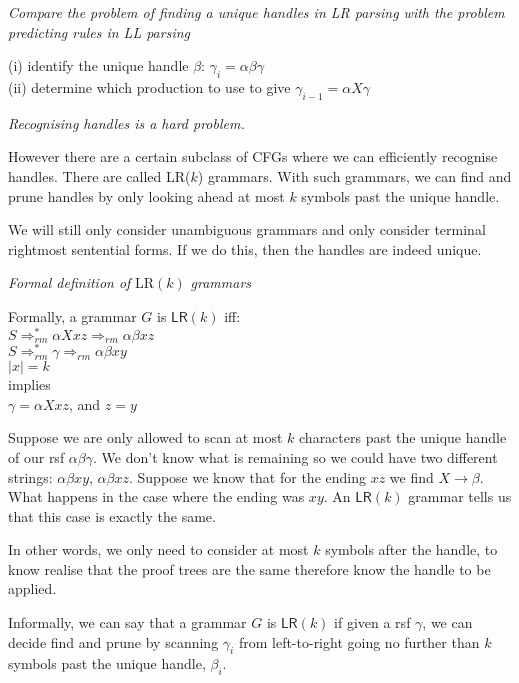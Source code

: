 \frmrule 

\textit{Compare the problem of finding a unique handles in LR parsing with the problem 
predicting rules in LL parsing }

(i) identify the unique handle $\beta$:
$\gamma_i = \alpha \beta\gamma$\\
(ii) determine which production to use to give $\gamma_{i-1} = \alpha X \gamma$

\frmrule 

\textit{Recognising handles is a hard problem. }


However there are a certain subclass of CFGs where we can efficiently 
recognise handles. There are called \textsf{LR}($k$) grammars. 
With such grammars, we can find and prune handles by only looking 
ahead at most $k$ symbols past the unique handle. 

We will still only consider unambiguous grammars 
and only consider terminal rightmost sentential forms. 
If we do this, then the handles are indeed unique. 

\frmrule 



\textit{Formal definition of} \textsf{LR}$(k)$ \textit{grammars }


Formally, a grammar $G$ is $\textsf{LR}(k)$ iff:\\
$S \Rightarrow^{*}_{rm} \alpha X xz \Rightarrow_{rm} \alpha \beta xz$ \\
$S \Rightarrow^{*}_{rm} \gamma      \Rightarrow_{rm} \alpha \beta xy$ \\
$|x| = k$\\
implies \\
$\gamma = \alpha X xz$, and $z=y$

Suppose we are only allowed to scan at most $k$ characters 
past the unique handle of our rsf $\alpha \beta \gamma$.
We don't know what is remaining so we could have two different 
strings: $\alpha \beta xy$, $\alpha \beta xz$.
Suppose we know that for the ending $xz$ we find $X \rightarrow \beta$. 
What happens in the case where the ending was $xy$. 
An  $\textsf{LR}(k)$ grammar tells us that this case is exactly 
the same.

In other words, we only need to consider at most $k$ symbols after the handle,
to know realise that the proof trees are the same therefore know
the handle to be applied.

Informally, we can say that a grammar $G$ is $\textsf{LR}(k)$ if 
given a rsf $\gamma$, we can decide find and prune by scanning 
$\gamma_i$ from left-to-right going no further than $k$ symbols 
past the unique handle, $\beta_i$. 

